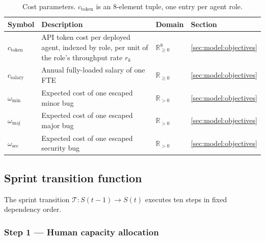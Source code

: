 \documentclass[smallextended]{svjour3}       %
\begin{document}
\begin{table}[t]
\caption{Cost parameters. $c_\mathrm{token}$ is an 8-element tuple, one entry per agent role.}
\label{tab:params:costs}
\footnotesize
\begin{tabularx}{\linewidth}{p{1.8cm}Xp{1.5cm}p{1.4cm}}
\toprule
Symbol & Description & Domain & Section \\
\midrule
$c_\mathrm{token}$              & API token cost per deployed agent, indexed by role, per unit of the role's throughput rate $r_k$ & $\mathbb{R}_{\geq 0}^8$ & \ref{sec:model:objectives} \\[2pt]
$c_\mathrm{salary}$             & Annual fully-loaded salary of one FTE                & $\mathbb{R}_{\geq 0}$   & \ref{sec:model:objectives} \\[2pt]
$\omega_\mathrm{min}$           & Expected cost of one escaped minor bug                                       & $\mathbb{R}_{>0}$        & \ref{sec:model:objectives} \\[2pt]
$\omega_\mathrm{maj}$           & Expected cost of one escaped major bug                                       & $\mathbb{R}_{>0}$        & \ref{sec:model:objectives} \\[2pt]
$\omega_\mathrm{sec}$           & Expected cost of one escaped security bug                                    & $\mathbb{R}_{>0}$        & \ref{sec:model:objectives} \\
\bottomrule
\end{tabularx}
\end{table}

\subsection{Sprint transition function}
\label{sec:model:transition}

The sprint transition $\mathcal{T}: S(t-1) \to S(t)$ executes ten steps in
fixed dependency order. 

\subsubsection*{Step 1 --- Human capacity allocation}
\end{document}
